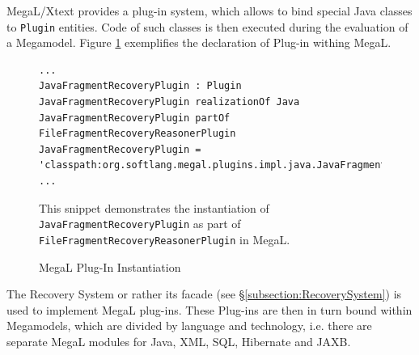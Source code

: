\gls{MegaL/Xtext} provides a plug-in system, which allows to bind special \gls{Java} classes to \texttt{Plugin} entities.
Code of such classes is then executed during the evaluation of a \gls{Megamodel}.
Figure \ref{figure:MegaLPluginInstantiation} exemplifies the declaration of Plug-in withing \gls{MegaL}.

\begin{figure}[h!]
\begin{lstlisting}
...
JavaFragmentRecoveryPlugin : Plugin
JavaFragmentRecoveryPlugin realizationOf Java
JavaFragmentRecoveryPlugin partOf FileFragmentRecoveryReasonerPlugin
JavaFragmentRecoveryPlugin = 'classpath:org.softlang.megal.plugins.impl.java.JavaFragmentRecoveryPlugin'
...
\end{lstlisting}
{
\scriptsize
This snippet demonstrates the instantiation of \texttt{JavaFragmentRecoveryPlugin} as part of \texttt{FileFragmentRecoveryReasonerPlugin} in \gls{MegaL}.
}
\caption{MegaL Plug-In Instantiation}
\label{figure:MegaLPluginInstantiation}
\end{figure}

The Recovery System or rather its facade (see §\ref{subsection:RecoverySystem}) is used to implement \gls{MegaL} plug-ins.
These Plug-ins are then in turn bound within \glspl{Megamodel}, which are divided by language and technology, i.e. there are separate \gls{MegaL} modules for \gls{Java}, \gls{XML}, \gls{SQL}, \gls{Hibernate} and \gls{JAXB}.
